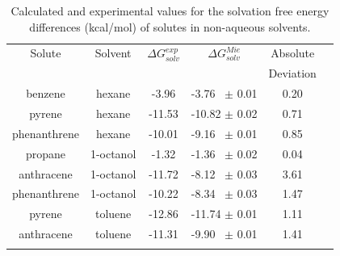 \begin{table}[h]
\centering
  \caption{Calculated and experimental values for the solvation free energy differences (kcal/mol) of solutes in non-aqueous solvents.}
  \label{tbl:solv1}
  \begin{tabular}{cccccc}
  	\hline\hline
  	Solute       & Solvent   & $\Delta G_{solv}^{exp}$ & $\Delta G_{solv}^{Mie}$ & Absolute  &  \\
  	             &           &                         &                         & Deviation &  \\ \hline\hline
  	benzene      & hexane    & -3.96                   & -3.76  $\,$ $\pm$ 0.01       & 0.20      &  \\
  	pyrene       & hexane    & -11.53                  & -10.82 $\pm$ 0.02       & 0.71      &  \\
  	phenanthrene & hexane    & -10.01                  & -9.16  $\,$ $\pm$ 0.01       & 0.85      &  \\
  	propane      & 1-octanol & -1.32                   & -1.36  $\,$ $\pm$ 0.02       & 0.04      &  \\
  	anthracene   & 1-octanol & -11.72                  & -8.12   $\,$ $\pm$ 0.03       & 3.61      &  \\
  	phenanthrene & 1-octanol & -10.22                  & -8.34  $\,$ $\pm$ 0.03       & 1.47      &  \\
  	pyrene       & toluene   & -12.86                  & -11.74 $\pm$ 0.01       & 1.11      &  \\
  	anthracene   & toluene   & -11.31                  & -9.90 $\,$ $\pm$ 0.01        & 1.41      &  \\ \hline\hline
  	             &
  \end{tabular}
\end{table}
\FloatBarrier

